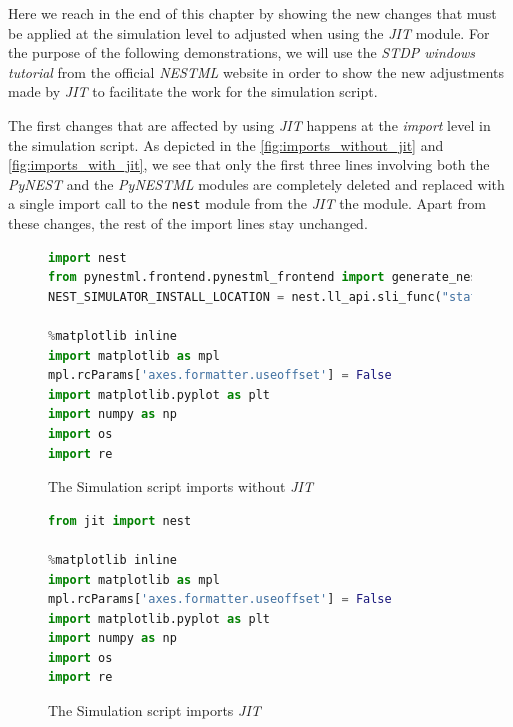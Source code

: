 Here we reach in the end of this chapter by showing the new changes that must be applied at the simulation level to adjusted when using the \emph{JIT} module.
For the purpose of the following demonstrations, we will use the \emph{STDP windows tutorial} from the official \emph{NESTML} website in order to show the new adjustments made by \emph{JIT} to facilitate the work for the simulation script.

 

The first changes that  are affected by using \emph{JIT} happens at the \emph{import} level in the simulation script. As depicted in the \autoref{fig:imports_without_jit} and \autoref{fig:imports_with_jit}, we see that only the first three lines involving both the \emph{PyNEST} and the \emph{PyNESTML} modules are completely deleted and replaced with a single import call to the \texttt{nest} module from the \emph{JIT} the module. Apart from these changes, the rest of the import lines stay unchanged. 

\begin{figure}[ht!]
\centering
\begin{lstlisting}[language=Python]
import nest
from pynestml.frontend.pynestml_frontend import generate_nest_target
NEST_SIMULATOR_INSTALL_LOCATION = nest.ll_api.sli_func("statusdict/prefix ::")

%matplotlib inline
import matplotlib as mpl
mpl.rcParams['axes.formatter.useoffset'] = False
import matplotlib.pyplot as plt
import numpy as np
import os
import re

\end{lstlisting}
\caption{The Simulation script imports without \emph{JIT}}
\label{fig:imports_without_jit}
\end{figure}

\begin{figure}[ht!]
\centering
\begin{lstlisting}[language=Python]
from jit import nest

%matplotlib inline
import matplotlib as mpl
mpl.rcParams['axes.formatter.useoffset'] = False
import matplotlib.pyplot as plt
import numpy as np
import os
import re
\end{lstlisting}
\caption{The Simulation script imports \emph{JIT}}
\label{fig:imports_with_jit}
\end{figure}


